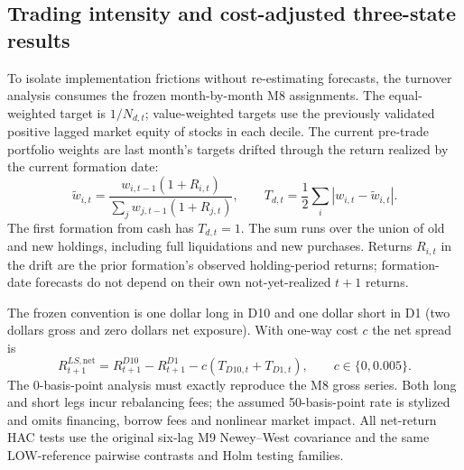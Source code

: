 \subsection{Trading intensity and cost-adjusted three-state results}

To isolate implementation frictions without re-estimating forecasts, the turnover analysis
consumes the frozen month-by-month M8 assignments. The equal-weighted target is $1/N_{d,t}$;
value-weighted targets use the previously validated positive lagged market equity of stocks
in each decile. The current pre-trade portfolio weights are last month's targets drifted
through the return realized by the current formation date:
\begin{equation}
 \widetilde{w}_{i,t}=\frac{w_{i,t-1}(1+R_{i,t})}{\sum_jw_{j,t-1}(1+R_{j,t})},
 \qquad
 T_{d,t}=\frac12\sum_i |w_{i,t}-\widetilde{w}_{i,t}|.
\end{equation}
The first formation from cash has $T_{d,t}=1$. The sum runs over the union of
old and new holdings, including full liquidations and new purchases. Returns
$R_{i,t}$ in the drift are the prior formation's observed holding-period returns;
formation-date forecasts do not depend on their own not-yet-realized $t+1$ returns.

The frozen convention is one dollar long in D10 and one dollar short in D1
(two dollars gross and zero dollars net exposure). With one-way cost $c$ the net spread is
\begin{equation}
 R^{LS,\mathrm{net}}_{t+1}=R^{D10}_{t+1}-R^{D1}_{t+1}
 -c\left(T_{D10,t}+T_{D1,t}\right),\qquad c\in\{0,0.005\}.
\end{equation}
The 0-basis-point analysis must exactly reproduce the M8 gross series.
Both long and short legs incur rebalancing fees; the assumed 50-basis-point
rate is stylized and omits financing, borrow fees and nonlinear market impact.
All net-return HAC tests use the original six-lag M9 Newey--West covariance
and the same LOW-reference pairwise contrasts and Holm testing families.


